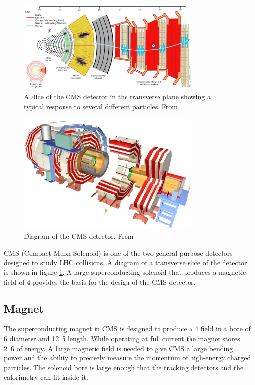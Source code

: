 \begin{figure}[htb!]
  \centering
  \includegraphics[width=0.8\textwidth]{CMS_Slice}
  \caption{A slice of the CMS detector in the transverse plane showing a
typical response to several different particles. 
From \cite{cmsSlice}.}
  \label{fig:CMS_Slice}
\end{figure}

\begin{figure}[htb!]
  \centering
  \includegraphics[width=0.8\textwidth]{CMSnc}
  \caption{Diagram of the CMS detector. From \cite{cms}}
  \label{fig:CMSnc}
\end{figure}

CMS (Compact Muon Solenoid)\cite{cms} is one of the two general purpose
detectors designed to study LHC collisions. 
A diagram of a transverse slice of the detector is shown in figure
\ref{fig:CMS_Slice}. 
A large superconducting solenoid that produces a magnetic field of
\unit{4}{\tesla} provides the basis for the design of the CMS detector. 


\subsection{Magnet}
The superconducting magnet in CMS is designed to produce a \unit{4}{\tesla}
field in a bore of 
\unit{6}{\meter} diameter and \unit{12.5}{\meter} length.
While operating at full current the magnet stores \unit{2.6}{\giga\joule} of
energy.
A large magnetic field is needed to give CMS a large bending power and the
ability to precisely measure the momentum of high-energy charged particles.
The solenoid bore is large enough that the tracking detectors and the
calorimetry can fit inside it.\cite{cms}

